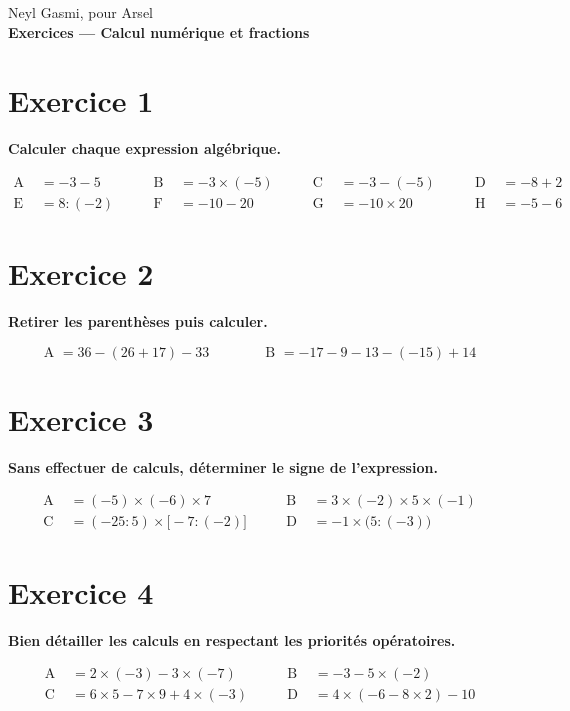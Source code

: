 \documentclass[a4paper,11pt]{article}
\begin{document}
Neyl Gasmi, pour Arsel\\
{\Large \textbf{Exercices — Calcul numérique et fractions}}\par\medskip

\section*{Exercice 1}
\textbf{Calculer chaque expression algébrique.}

\[
\begin{aligned}
\text{A }&= -3-5
&\qquad \text{B }&= -3\times(-5)
&\qquad \text{C }&= -3-(-5)
&\qquad \text{D }&= -8+2\\[2pt]
\text{E }&= 8:(-2)
&\qquad \text{F }&= -10-20
&\qquad \text{G }&= -10\times 20
&\qquad \text{H }&= -5-6
\end{aligned}
\]

\section*{Exercice 2}
\textbf{Retirer les parenthèses puis calculer.}

\[
\text{A }= 36-(26+17)-33
\qquad\qquad
\text{B }= -17-9-13-(-15)+14
\]

\section*{Exercice 3}
\textbf{Sans effectuer de calculs, déterminer le signe de l'expression.}

\[
\begin{aligned}
\text{A }&= (-5)\times(-6)\times 7
&\qquad
\text{B }&= 3\times(-2)\times 5\times(-1)\\[2pt]
\text{C }&= (-25:5)\times\bigl[-7:(-2)\bigr]
&\qquad
\text{D }&= -1\times\bigl(5:(-3)\bigr)
\end{aligned}
\]

\section*{Exercice 4}
\textbf{Bien détailler les calculs en respectant les priorités opératoires.}

\[
\begin{aligned}
\text{A }&= 2\times(-3)-3\times(-7)
&\qquad
\text{B }&= -3-5\times(-2)\\[2pt]
\text{C }&= 6\times 5 - 7\times 9 + 4\times(-3)
&\qquad
\text{D }&= 4\times(-6-8\times 2)-10
\end{aligned}
\]
\end{document}
